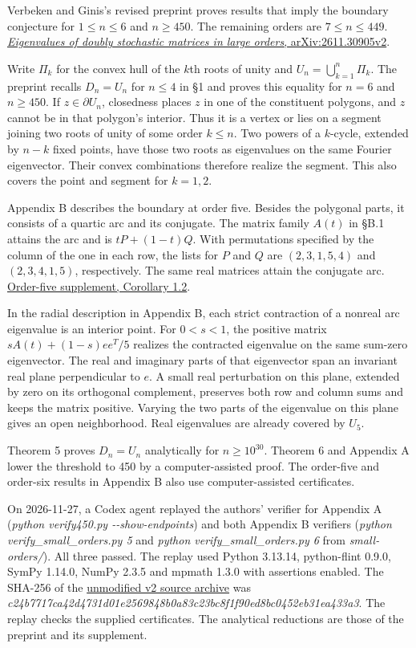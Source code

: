 \documentclass[11pt,a4paper]{article}
\begin{document}
Verbeken and Ginis's revised preprint proves results that imply the
boundary conjecture for \(1\le n\le 6\) and \(n\ge 450\). The remaining
orders are \(7\le n\le 449\).
\href{https://arxiv.org/html/2611.30905v2}{\emph{Eigenvalues of doubly
stochastic matrices in large orders}, arXiv:2611.30905v2}.

Write \(\Pi_k\) for the convex hull of the \(k\)th roots of unity and
\(U_n=\bigcup_{k=1}^n\Pi_k\). The preprint recalls \(D_n=U_n\) for
\(n\le 4\) in §1 and proves this equality for \(n=6\) and \(n\ge 450\).
If \(z\in\partial U_n\), closedness places \(z\) in one of the
constituent polygons, and \(z\) cannot be in that polygon's interior.
Thus it is a vertex or lies on a segment joining two roots of unity of
some order \(k\le n\). Two powers of a \(k\)-cycle, extended by \(n-k\)
fixed points, have those two roots as eigenvalues on the same Fourier
eigenvector. Their convex combinations therefore realize the segment.
This also covers the point and segment for \(k=1,2\).

Appendix B describes the boundary at order five. Besides the polygonal
parts, it consists of a quartic arc and its conjugate. The matrix family
\(A(t)\) in §B.1 attains the arc and is \(tP+(1-t)Q\). With permutations
specified by the column of the one in each row, the lists for \(P\) and
\(Q\) are \((2,3,1,5,4)\) and \((2,3,4,1,5)\), respectively. The same
real matrices attain the conjugate arc.
\href{https://arxiv.org/src/2611.30905v2/anc/small-orders/order5/proof.pdf}{Order-five
supplement, Corollary 1.2}.

In the radial description in Appendix B, each strict contraction of a
nonreal arc eigenvalue is an interior point. For \(0< s<1\), the
positive matrix \(sA(t)+(1-s)ee^T/5\) realizes the contracted eigenvalue
on the same sum-zero eigenvector. The real and imaginary parts of that
eigenvector span an invariant real plane perpendicular to \(e\). A small
real perturbation on this plane, extended by zero on its orthogonal
complement, preserves both row and column sums and keeps the matrix
positive. Varying the two parts of the eigenvalue on this plane gives an
open neighborhood. Real eigenvalues are already covered by \(U_5\).

Theorem 5 proves \(D_n=U_n\) analytically for \(n\ge 10^{30}\). Theorem
6 and Appendix A lower the threshold to 450 by a computer-assisted
proof. The order-five and order-six results in Appendix B also use
computer-assisted certificates.

On 2026-11-27, a Codex agent replayed the authors' verifier for Appendix
A (\textit{python verify450.py -\/-show-endpoints}) and both Appendix
B verifiers (\textit{python verify\_small\_orders.py 5} and
\textit{python verify\_small\_orders.py 6} from
\textit{small-orders/}). All three passed. The replay used Python
3.13.14, python-flint 0.9.0, SymPy 1.14.0, NumPy 2.3.5 and mpmath 1.3.0
with assertions enabled. The SHA-256 of the
\href{https://arxiv.org/src/2611.30905v2}{unmodified v2 source archive}
was
\textit{c24b7717ca42d4731d01e2569848b0a83c23bc8f1f90ed8bc0452eb31ea433a3}.
The replay checks the supplied certificates. The analytical reductions
are those of the preprint and its supplement.
\end{document}
